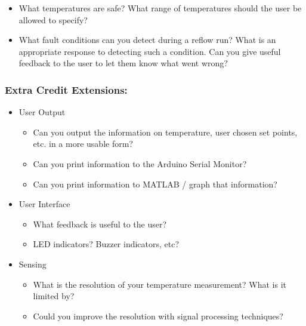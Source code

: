 \documentclass[10pt]{report}
\begin{document}
\begin{itemize}
\begin{itemize}
	\item What temperatures are safe? What range of temperatures should the user be allowed to specify?

	\item What fault conditions can you detect during a reflow run? What is an appropriate response to detecting such a condition. Can you give useful feedback to the user to let them know what went wrong? 
	\end{itemize}
\end{itemize}

\subsubsection{Extra Credit Extensions:}

\begin{itemize}
\item User Output
	\begin{itemize}
	\item Can you output the information on temperature, user chosen set points, etc. in a more usable form?
	\item Can you print information to the Arduino Serial Monitor?
	\item Can you print information to MATLAB / graph that information?
	\end{itemize}
\item User Interface
	\begin{itemize}
	\item What feedback is useful to the user?
	\item LED indicators? Buzzer indicators, etc?
	\end{itemize}
\item Sensing
	\begin{itemize}
	\item What is the resolution of your temperature measurement? What is it limited by?
	\item Could you improve the resolution with signal processing techniques? 
	\end{itemize}
\end{itemize}
\end{document}
